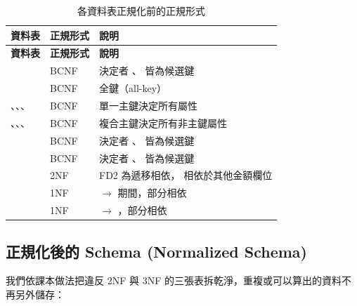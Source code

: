 \begingroup\small
\begin{xltabular}{\linewidth}{|>{\raggedright\arraybackslash}p{3.6cm}|>{\centering\arraybackslash}p{1.6cm}|>{\raggedright\arraybackslash}X|}
\caption{各資料表正規化前的正規形式}\\
\hline{}\textbf{資料表} & \textbf{正規形式} & \textbf{說明}\\\hline\endfirsthead
\hline{}\textbf{資料表} & \textbf{正規形式} & \textbf{說明}\\\hline\endhead
{} & BCNF & 決定者 、 皆為候選鍵\\\hline
{} & BCNF & 全鍵（all-key）\\\hline
{}、、、 & BCNF & 單一主鍵決定所有屬性\\\hline
{}、、、 & BCNF & 複合主鍵決定所有非主鍵屬性\\\hline
{} & BCNF & 決定者 、 皆為候選鍵\\\hline
{} & BCNF & 決定者 、 皆為候選鍵\\\hline
{} & 2NF & FD2 為遞移相依， 相依於其他金額欄位\\\hline
{} & 1NF &  $\to$ 期間，部分相依\\\hline
{} & 1NF &  $\to$ ，部分相依\\\hline
\end{xltabular}
\endgroup

\subsection{正規化後的 Schema (Normalized Schema)}

我們依課本做法把違反 2NF 與 3NF 的三張表拆乾淨，重複或可以算出的資料不再另外儲存：

